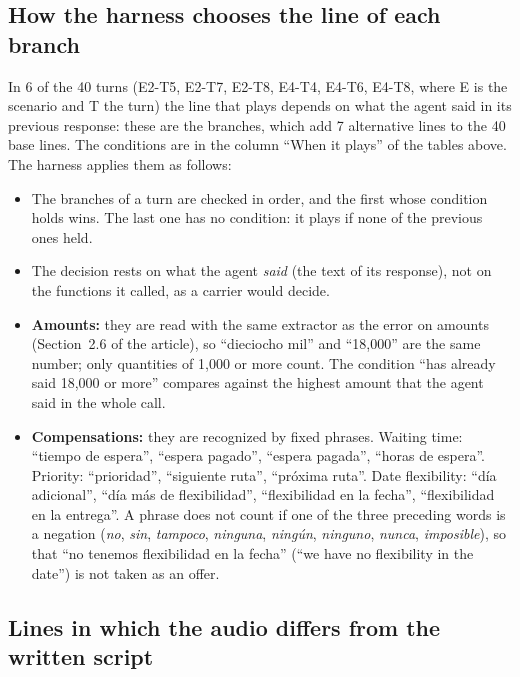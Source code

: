 \documentclass[11pt]{article}
\newcommand{\RGuionAlt}{7}
\newcommand{\RGuionBase}{40}
\newcommand{\RGuionTurnosConRamas}{6}
\newcommand{\RGuionTurnosConRamasLista}{E2-T5, E2-T7, E2-T8, E4-T4, E4-T6, E4-T8}
\begin{document}
\subsection{How the harness chooses the line of each branch}
\label{sec:ramas}

In \RGuionTurnosConRamas{} of the \RGuionBase{} turns (\RGuionTurnosConRamasLista,
where E is the scenario and T the turn) the line that plays depends on what the
agent said in its previous response: these are the branches, which add
\RGuionAlt{} alternative lines to the \RGuionBase{} base lines. The conditions are
in the column ``When it plays'' of the tables above. The harness applies them as
follows:
\begin{itemize}[leftmargin=1.4cm]
  \item The branches of a turn are checked in order, and the first whose condition
  holds wins. The last one has no condition: it plays if none of the previous ones
  held.
  \item The decision rests on what the agent \emph{said} (the text of its
  response), not on the functions it called, as a carrier would decide.
  \item \textbf{Amounts:} they are read with the same extractor as the error on
  amounts (Section~2.6 of the article), so ``dieciocho mil'' and ``18,000'' are the
  same number; only quantities of 1,000 or more count. The condition ``has already
  said 18,000 or more'' compares against the highest amount that the agent said in
  the whole call.
  \item \textbf{Compensations:} they are recognized by fixed phrases. Waiting time:
  ``tiempo de espera'', ``espera pagado'', ``espera pagada'', ``horas de espera''.
  Priority: ``prioridad'', ``siguiente ruta'', ``próxima ruta''. Date flexibility:
  ``día adicional'', ``día más de flexibilidad'', ``flexibilidad en la fecha'',
  ``flexibilidad en la entrega''. A phrase does not count if one of the three
  preceding words is a negation (\emph{no}, \emph{sin}, \emph{tampoco},
  \emph{ninguna}, \emph{ningún}, \emph{ninguno}, \emph{nunca}, \emph{imposible}),
  so that ``no tenemos flexibilidad en la fecha'' (``we have no flexibility in the
  date'') is not taken as an offer.
\end{itemize}

\subsection{Lines in which the audio differs from the written script}
\label{sec:correcciones}
\end{document}
